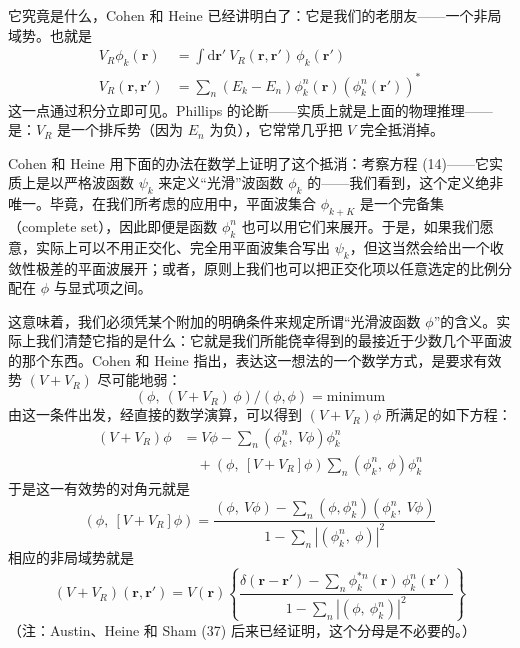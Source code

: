 它究竟是什么，Cohen 和 Heine 已经讲明白了：它是我们的老朋友——一个非局域势。也就是
\begin{align*}
V_R\phi_k(\mathbf{r})&=\int \mathrm{d}\mathbf{r}'\ V_R(\mathbf{r},\mathbf{r}')\,\phi_k(\mathbf{r}')\\
V_R(\mathbf{r},\mathbf{r}')&=\sum_n\left(E_k-E_n\right)\phi_k^n(\mathbf{r})\left(\phi_k^n(\mathbf{r}')\right)^*
\end{align*}
这一点通过积分立即可见。Phillips 的论断——实质上就是上面的物理推理——是：$V_R$ 是一个排斥势（因为 $E_n$ 为负），它常常几乎把 $V$ 完全抵消掉。

Cohen 和 Heine 用下面的办法在数学上证明了这个抵消：考察方程 (14)——它实质上是以严格波函数 $\psi_k$ 来定义“光滑”波函数 $\phi_k$ 的——我们看到，这个定义绝非唯一。毕竟，在我们所考虑的应用中，平面波集合 $\phi_{k+K}$ 是一个完备集（complete set），因此即便是函数 $\phi_k^n$ 也可以用它们来展开。于是，如果我们愿意，实际上可以不用正交化、完全用平面波集合写出 $\psi_k$，但这当然会给出一个收敛性极差的平面波展开；或者，原则上我们也可以把正交化项以任意选定的比例分配在 $\phi$ 与显式项之间。

这意味着，我们必须凭某个附加的明确条件来规定所谓“光滑波函数 $\phi$”的含义。实际上我们清楚它指的是什么：它就是我们所能侥幸得到的最接近于少数几个平面波的那个东西。Cohen 和 Heine 指出，表达这一想法的一个数学方式，是要求有效势 $(V+V_R)$ 尽可能地弱：
\begin{equation*}
\left(\phi,\ (V+V_R)\,\phi\right)/\left(\phi,\phi\right)=\text{minimum}
\end{equation*}
由这一条件出发，经直接的数学演算，可以得到 $(V+V_R)\phi$ 所满足的如下方程：
\begin{align*}
(V+V_R)\phi&=V\phi-\sum_n\left(\phi_k^n,\ V\phi\right)\phi_k^n\\
&\quad+\left(\phi,\ \left[V+V_R\right]\phi\right)\sum_n\left(\phi_k^n,\ \phi\right)\phi_k^n
\end{align*}
于是这一有效势的对角元就是
\begin{equation*}
\left(\phi,\ \left[V+V_R\right]\phi\right)=\frac{\left(\phi,\ V\phi\right)-\sum_n\left(\phi,\phi_k^n\right)\left(\phi_k^n,\ V\phi\right)}{1-\sum_n\left|\left(\phi_k^n,\ \phi\right)\right|^2}
\end{equation*}
相应的非局域势就是
\begin{equation*}
(V+V_R)(\mathbf{r},\mathbf{r}')=V(\mathbf{r})\left\{\frac{\delta(\mathbf{r}-\mathbf{r}')-\sum_n\phi_k^{*n}(\mathbf{r})\,\phi_k^n(\mathbf{r}')}{1-\sum_n\left|\left(\phi,\ \phi_k^n\right)\right|^2}\right\}\tag{17}
\end{equation*}
（注：Austin、Heine 和 Sham (37) 后来已经证明，这个分母是不必要的。）

